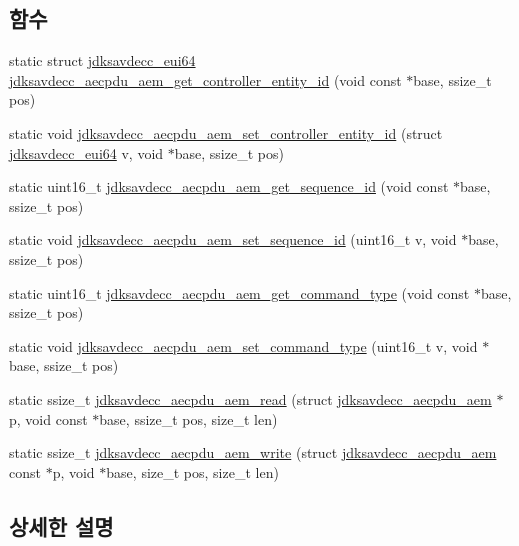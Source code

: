 \subsection*{함수}
\begin{DoxyCompactItemize}
\item 
static struct \hyperlink{structjdksavdecc__eui64}{jdksavdecc\+\_\+eui64} \hyperlink{group__aecpdu__aem_ga544dccad3d79971f9113e85bb30c0583}{jdksavdecc\+\_\+aecpdu\+\_\+aem\+\_\+get\+\_\+controller\+\_\+entity\+\_\+id} (void const $\ast$base, ssize\+\_\+t pos)
\item 
static void \hyperlink{group__aecpdu__aem_ga9c45d30c6f1ea007015a321386cf47e3}{jdksavdecc\+\_\+aecpdu\+\_\+aem\+\_\+set\+\_\+controller\+\_\+entity\+\_\+id} (struct \hyperlink{structjdksavdecc__eui64}{jdksavdecc\+\_\+eui64} v, void $\ast$base, ssize\+\_\+t pos)
\item 
static uint16\+\_\+t \hyperlink{group__aecpdu__aem_gaaffda13b68d7c9a5decb3006492b85ee}{jdksavdecc\+\_\+aecpdu\+\_\+aem\+\_\+get\+\_\+sequence\+\_\+id} (void const $\ast$base, ssize\+\_\+t pos)
\item 
static void \hyperlink{group__aecpdu__aem_ga4bde443f436a496c3f8da8a71c61271d}{jdksavdecc\+\_\+aecpdu\+\_\+aem\+\_\+set\+\_\+sequence\+\_\+id} (uint16\+\_\+t v, void $\ast$base, ssize\+\_\+t pos)
\item 
static uint16\+\_\+t \hyperlink{group__aecpdu__aem_ga61a282324f09f449059b9fe710363710}{jdksavdecc\+\_\+aecpdu\+\_\+aem\+\_\+get\+\_\+command\+\_\+type} (void const $\ast$base, ssize\+\_\+t pos)
\item 
static void \hyperlink{group__aecpdu__aem_ga844e26b1a57d3b1e674be0f6f1bb2815}{jdksavdecc\+\_\+aecpdu\+\_\+aem\+\_\+set\+\_\+command\+\_\+type} (uint16\+\_\+t v, void $\ast$base, ssize\+\_\+t pos)
\item 
static ssize\+\_\+t \hyperlink{group__aecpdu__aem_gae2421015dcdce745b4f03832e12b4fb6}{jdksavdecc\+\_\+aecpdu\+\_\+aem\+\_\+read} (struct \hyperlink{structjdksavdecc__aecpdu__aem}{jdksavdecc\+\_\+aecpdu\+\_\+aem} $\ast$p, void const $\ast$base, ssize\+\_\+t pos, size\+\_\+t len)
\item 
static ssize\+\_\+t \hyperlink{group__aecpdu__aem_gad658e55771cce77cecf7aae91e1dcbc5}{jdksavdecc\+\_\+aecpdu\+\_\+aem\+\_\+write} (struct \hyperlink{structjdksavdecc__aecpdu__aem}{jdksavdecc\+\_\+aecpdu\+\_\+aem} const $\ast$p, void $\ast$base, size\+\_\+t pos, size\+\_\+t len)
\end{DoxyCompactItemize}


\subsection{상세한 설명}


